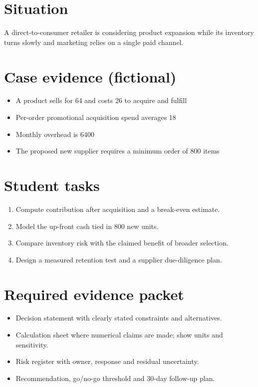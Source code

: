 \documentclass[11pt]{article}
\begin{document}
\SuiteOpen
\section{Situation}
A direct-to-consumer retailer is considering product expansion while its inventory turns slowly and marketing relies on a single paid channel.
\section{Case evidence (fictional)}
\begin{itemize}[leftmargin=*,itemsep=3pt]
\item A product sells for 64 and costs 26 to acquire and fulfill
\item Per-order promotional acquisition spend averages 18
\item Monthly overhead is 6400
\item The proposed new supplier requires a minimum order of 800 items
\end{itemize}

\section{Student tasks}
\begin{enumerate}[leftmargin=*,itemsep=5pt]
\item Compute contribution after acquisition and a break-even estimate.
\item Model the up-front cash tied in 800 new units.
\item Compare inventory risk with the claimed benefit of broader selection.
\item Design a measured retention test and a supplier due-diligence plan.
\end{enumerate}

\section{Required evidence packet}
\begin{itemize}[leftmargin=*,itemsep=3pt]
\item Decision statement with clearly stated constraints and alternatives.
\item Calculation sheet where numerical claims are made; show units and sensitivity.
\item Risk register with owner, response and residual uncertainty.
\item Recommendation, go/no-go threshold and 30-day follow-up plan.
\end{itemize}
\end{document}
